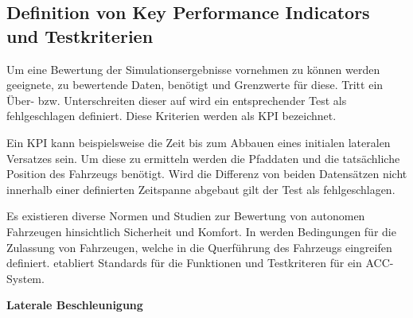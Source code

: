 \subsection{Definition von Key Performance Indicators und Testkriterien} \label{subsec:KPI}

Um eine Bewertung der Simulationsergebnisse vornehmen zu können werden geeignete, zu bewertende Daten, benötigt und Grenzwerte für diese. Tritt ein Über- bzw. Unterschreiten dieser auf wird ein entsprechender Test als fehlgeschlagen definiert. Diese Kriterien werden als KPI bezeichnet.

Ein KPI kann beispielsweise die Zeit bis zum Abbauen eines initialen lateralen Versatzes sein. Um diese zu ermitteln werden die Pfaddaten und die tatsächliche Position des Fahrzeugs benötigt. Wird die Differenz von beiden Datensätzen nicht innerhalb einer definierten Zeitspanne abgebaut gilt der Test als fehlgeschlagen.

Es existieren diverse Normen und Studien zur Bewertung von autonomen Fahrzeugen hinsichtlich Sicherheit und Komfort. In \cite{UNECE_R79} werden Bedingungen für die Zulassung von Fahrzeugen, welche in die Querführung des Fahrzeugs eingreifen definiert. \cite{ISO15622} etabliert Standards für die Funktionen und Testkriteren für ein ACC-System.

\bigskip\noindent\textbf{Laterale Beschleunigung}

